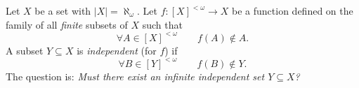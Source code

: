 Let $X$ be a set with $|X|=\aleph_\omega$. Let $f:[X]^{<\omega}\to X$ be a function defined on the family of all \emph{finite} subsets of $X$ such that
\[
\forall A\in [X]^{<\omega}\qquad f(A)\notin A.
\]
A subset $Y\subseteq X$ is \emph{independent} (for $f$) if
\[
\forall B\in [Y]^{<\omega}\qquad f(B)\notin Y.
\]
The question is: \emph{Must there exist an infinite independent set $Y\subseteq X$?}
